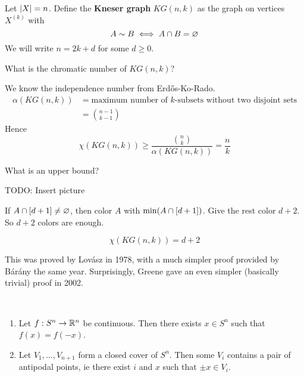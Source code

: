 \documentclass{article}
\begin{document}
\newlec

Let $\left\lvert X\right\rvert = n$. Define the {\bf Kneser graph} $KG(n, k)$ as the graph on vertices $X^{(k)}$ with
$$A \sim B \iff A \cap B = \varnothing$$
We will write $n = 2k + d$ for some $d \ge 0$.

\begin{question}
  What is the chromatic number of $KG(n, k)$?
\end{question}

We know the independence number from Erd\H os-Ko-Rado.
\begin{align*}
  \alpha(KG(n, k))
  & = \text{maximum number of $k$-subsets without two disjoint sets} \\
  & = \binom{n - 1}{k - 1}
\end{align*}
Hence
$$\chi(KG(n, k)) \ge \frac{\binom nk}{\alpha(KG(n, k))} = \frac nk$$

What is an upper bound?

TODO: Insert picture

If $A \cap [d + 1] \ne \varnothing$, then color $A$ with $\min(A \cap [d + 1])$. Give the rest color $d + 2$. So $d + 2$ colors are enough.

\begin{conjecture}[Kneser]
  $$\chi(KG(n, k)) = d + 2$$
\end{conjecture}

This was proved by Lov\'asz in 1978, with a much simpler proof provided by B\'ar\'any the same year. Surprisingly, Greene gave an even simpler (basically trivial) proof in 2002.

\begin{nthm}\label{thm:borsuk}~
  \begin{enumerate}
    \item Let $f : S^n \rightarrow \mathbb R^n$ be continuous. Then there exists $x \in S^n$ such that $f(x) = f(-x)$.
    \item Let $V_1, \dots, V_{n + 1}$ form a closed cover of $S^n$. Then some $V_i$ contains a pair of antipodal points, ie there exist $i$ and $x$ such that $\pm x \in V_i$.
  \end{enumerate}
\end{nthm}
\end{document}
